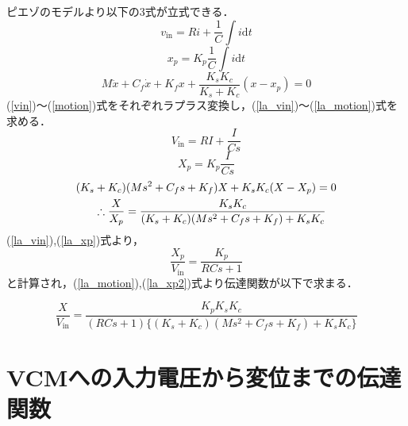 \documentclass[a4j,11pt]{jarticle}
\begin{document}
ピエゾのモデルより以下の3式が立式できる．
%
\begin{equation}
	\label{vin}
	v_\mathrm{in} = R i + \frac{1}{C}\int{i \mathrm{d}t}
\end{equation}
%
\begin{equation}
	\label{xp}
	x_p = K_p \frac{1}{C}\int{i \mathrm{d}t}
\end{equation}
%
\begin{equation}
	\label{motion}
	M \ddot{x} + C_f \dot{x} + K_f x + \frac{K_s K_c}{K_s + K_c} (x - x_p) = 0
\end{equation}
%
(\ref{vin})～(\ref{motion})式をそれぞれラプラス変換し，(\ref{la_vin})～(\ref{la_motion})式を求める．
%
\begin{equation}
	\label{la_vin}
	V_\mathrm{in} = R I + \frac{I}{Cs}
\end{equation}
%
\begin{equation}
	\label{la_xp}
	X_p = K_p \frac{I}{Cs}
\end{equation}
%
\begin{align}
	(K_s & +K_c)(Ms^2 + C_f s + K_f)X + K_s K_c(X - X_p) = 0 \nonumber \vspace{5mm}                              \\
	     & \therefore \frac{X}{X_p} = \frac{K_s K_c}{(K_s+K_c)(Ms^2 + C_f s + K_f) + K_s K_c}  \label{la_motion} 
\end{align}
%
(\ref{la_vin}),(\ref{la_xp})式より，
\begin{equation}
	\label{la_xp2}
	\frac{X_p}{V_\mathrm{in}} = \frac{K_p}{RCs+1}
\end{equation}
と計算され，(\ref{la_motion}),(\ref{la_xp2})式より伝達関数が以下で求まる．

\begin{equation}
	\label{la_x}
	\frac{X}{V_\mathrm{in}} = \frac{K_p K_s K_c}{(RCs+1)\{(K_s+K_c)(Ms^2 + C_f s + K_f) + K_s K_c\}}
\end{equation}


\vspace{+10mm}
\section{VCMへの入力電圧から変位までの伝達関数}
\vspace{2mm}
\end{document}
